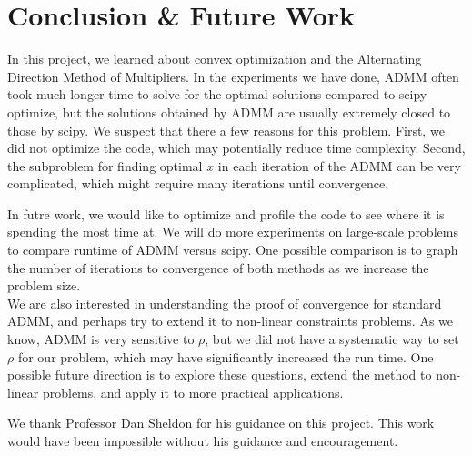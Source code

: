 \documentclass{article}
\begin{document}
\section{Conclusion \& Future Work}
In this project, we learned about convex optimization and the Alternating Direction Method of Multipliers. In the experiments we have done, ADMM often took much longer time to solve for the optimal solutions compared to scipy optimize, but the solutions obtained by ADMM are usually extremely closed to those by scipy. We suspect that there a few reasons for this problem. First, we did not optimize the code, which may potentially reduce time complexity. Second, the subproblem for finding optimal $x$ in each iteration of the ADMM can be very complicated, which might require many iterations until convergence.\newline
	
In futre work, we would like to optimize and profile the code to see where it is spending the most time at. We will do more experiments on large-scale problems to compare runtime of ADMM versus scipy. One possible comparison is to graph the number of iterations to convergence of both methods as we increase the problem size.\\

We are also interested in understanding the proof of convergence for standard ADMM, and perhaps try to extend it to non-linear constraints problems. As we know, ADMM is very sensitive to $\rho$, but we did not have a systematic way to set $\rho$ for our problem, which may have significantly increased the run time. One possible future direction is to explore these questions, extend the method to non-linear problems, and apply it to more practical applications.\newline

We thank Professor Dan Sheldon for his guidance on this project. This work would have been impossible without his guidance and encouragement. 


%
%
%
\end{document}
